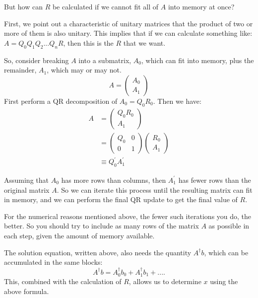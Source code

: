 But how can $R$ be calculated if we cannot fit all of $A$ into memory at once?

First, we point out a characteristic of unitary matrices that the product 
of two or more of them is also unitary.  
This implies that if we can calculate
something like: $A = Q_0 Q_1 Q_2 ... Q_n R$, then this is the $R$ that we want.

So, consider breaking $A$ into a submatrix, $A_0$, which can fit into memory, 
plus the remainder, $A_1$, which may or may not.
\begin{equation*}
A = \left(\begin{array}{c}A_0 \\A_1\end{array}\right)
\end{equation*}
First perform a QR decomposition of $A_0 = Q_0 R_0$.  Then we have:
\begin{align*}
A &= \left(\begin{array}{c}Q_0 R_0 \\ A_1 \end{array}\right) \\
&= \left(\begin{array}{cc}Q_0 & 0 \\ 0 & 1\end{array}\right) 
      \left(\begin{array}{c}R_0 \\ A_1 \end{array}\right) \\
&\equiv Q_0^\prime A_1^\prime
\end{align*}

Assuming that $A_0$ has more rows than columns, 
then $A_1^\prime$ has fewer rows than
the original matrix $A$.  So we can iterate this process until the 
resulting matrix can fit in memory, and we can perform the final QR update
to get the final value of $R$.

For the numerical reasons mentioned above, 
the fewer such iterations you do, the better.  So you should try to include as many
rows of the matrix $A$ as possible in each step, given the amount of memory
available.

The solution equation, written above, also needs the quantity $A^\dagger b$, which
can be accumulated in the same blocks:
\begin{equation*}
A^\dagger b = A_0^\dagger b_0 + A_1^\dagger b_1 + ....
\end{equation*}
This, combined with the calculation of $R$, allows us to determine $x$ using the above formula.

